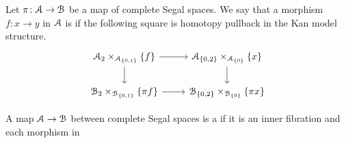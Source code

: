 \documentclass[main.tex]{subfiles}
\begin{document}
\begin{definition}
  Let $\pi\colon \mathcal{A} \to \mathcal{B}$ be a map of complete Segal spaces. We say that a morphism $f\colon x \to y$ in $\mathcal{A}$ is  if the following square is homotopy pullback in the Kan model structure.
  \begin{equation*}
    \begin{tikzcd}
      \category{A}_{2} \times_{\category{A}_{\{0, 1\}}} \{f\}
      \arrow[r]
      \arrow[d]
      & \category{A}_{\{0,2\}} \times_{\category{A}_{\{0\}}} \{x\}
      \arrow[d]
      \\
      \category{B}_{2} \times_{\category{B}_{\{0, 1\}}} \{\pi f\}
      \arrow[r]
      & \category{B}_{\{0, 2\}} \times_{\category{B}_{\{0\}}} \{\pi x\}
    \end{tikzcd}
  \end{equation*}
\end{definition}

\begin{definition}
  A map $\mathcal{A} \to \mathcal{B}$ between complete Segal spaces is a  if it is an inner fibration and each morphism in
\end{definition}

%
%
\end{document}
